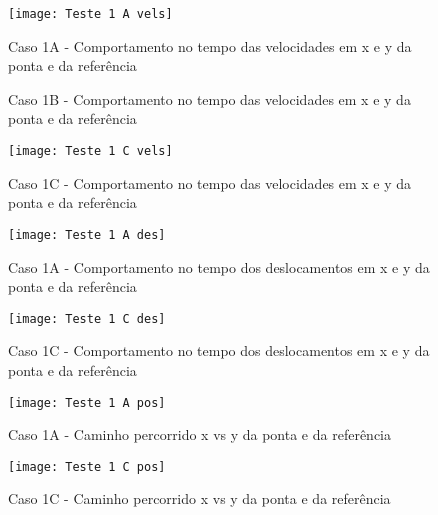 \begin{figure}[H]
    \begin{center}
    \caption{Caso 1A - Comportamento no tempo das velocidades em x e y da ponta e da referência}
    \texttt{[image: Teste 1 A vels]}
    \label{fig:t_1a_vels}
    \end{center}
\end{figure}

\begin{figure}[H]
    \begin{center}
    \caption{Caso 1B - Comportamento no tempo das velocidades em x e y da ponta e da referência}
    \label{fig:t_1b_vels}
    \end{center}
\end{figure}

\begin{figure}[H]
    \begin{center}
    \caption{Caso 1C - Comportamento no tempo das velocidades em x e y da ponta e da referência}
    \texttt{[image: Teste 1 C vels]}
    \label{fig:t_1c_vels}
    \end{center}
\end{figure}

\begin{figure}[H]
    \begin{center}
    \caption{Caso 1A - Comportamento no tempo dos deslocamentos em x e y da ponta e da referência}
    \texttt{[image: Teste 1 A des]}
    \label{fig:t_1a_des}
    \end{center}
\end{figure}

\begin{figure}[H]
    \begin{center}
    \caption{Caso 1C - Comportamento no tempo dos deslocamentos em x e y da ponta e da referência}
    \texttt{[image: Teste 1 C des]}
    \label{fig:t_1c_des}
    \end{center}
\end{figure}

\begin{figure}[H]
    \begin{center}
    \caption{Caso 1A - Caminho percorrido x vs y da ponta e da referência}
    \texttt{[image: Teste 1 A pos]}
    \label{fig:t_1a_pos}
    \end{center}
\end{figure}

\begin{figure}[H]
    \begin{center}
    \caption{Caso 1C - Caminho percorrido x vs y da ponta e da referência}
    \texttt{[image: Teste 1 C pos]}
    \label{fig:t_1c_pos}
    \end{center}
\end{figure}

